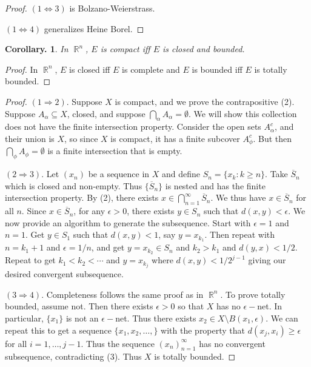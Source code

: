 \documentclass[11pt, a4paper]{memoir}
\DeclareMathOperator{\R}{{\mathbb{R}}}
\theoremstyle{change}
\newtheorem{corollary}[theorem]{Corollary.}
\theoremstyle{plain}
\theoremstyle{nonumberplain}
\newtheorem{proof}{Proof}
\numberwithin{equation}{section}
\begin{document}
\begin{proof}
    $(1\Leftrightarrow 3)$ is Bolzano-Weierstrass.

    $(1\Leftrightarrow 4)$ generalizes Heine Borel.
\end{proof}
\begin{corollary}
    In $\R^n$, $E$ is compact iff $E$ is closed and bounded.
\end{corollary}
\begin{proof}
    In $\R^n$, $E$ is closed iff $E$ is complete and $E$ is bounded iff $E$ is totally bounded.
\end{proof}
\begin{proof}
    $(1\Rightarrow 2)$. Suppose $X$ is compact, and we prove the contrapositive (2).
    Suppose $A_\alpha\subseteq X$, closed, and suppose $\bigcap_{\alpha}A_\alpha=\emptyset$. We will
    show this collection does not have the finite intersection property. Consider the open sets $A_\alpha^c$, and their union is
    $X$, so since $X$ is compact, it has a finite subcover $A_\phi^c$. But then $\bigcap_\phi A_\phi=\emptyset$ is a finite
    intersection that is empty.

    $(2\Rightarrow 3)$. Let $(x_n)$ be a sequence in $X$ and define $S_n=\{x_k:k\geq n\}$. Take $\overline{S}_n$ which is closed
    and non-empty. Thus $\{\overline{S}_n\}$ is nested and has the finite intersection property. By (2), there exists
    $x\in\bigcap_{n=1}^\infty\overline{S}_n$. We thus have $x\in\overline{S}_n$ for all $n$. Since $x\in\overline{S}_n$,
    for any $\epsilon>0$, there exists $y\in S_n$ such that $d(x,y)<\epsilon$. We now provide an algorithm to generate the
    subsequence. Start with $\epsilon=1$ and $n=1$. Get $y\in S_1$ such that $d(x,y)<1$, say $y=x_{k_1}$.
    Then repeat with $n=k_1+1$ and $\epsilon=1/n$, and get $y=x_{k_2}\in S_n$ and $k_2>k_1$ and $d(y,x)<1/2$. Repeat to
    get $k_1<k_2<\cdots$ and $y=x_{k_j}$ where $d(x,y)<1/2^{j-1}$ giving our desired convergent subsequence.

    $(3\Rightarrow 4)$. Completeness follows the same proof as in $\R^n$. To prove totally bounded, assume not. Then there exists $\epsilon>0$ so
    that $X$ has no $\epsilon-$net. In particular, $\{x_1\}$ is not an $\epsilon-$net. Thus there exists $x_2\in X\setminus B(x_1,\epsilon)$.
    We can repeat this to get a sequence $\{x_1,x_2,\ldots,\}$ with the property that $d(x_j,x_i)\geq\epsilon$ for all $i=1,\ldots,j-1$.
    Thus the sequence $(x_n)_{n=1}^\infty$ has no convergent subsequence, contradicting (3). Thus $X$ is totally bounded.


\end{proof}
\end{document}
